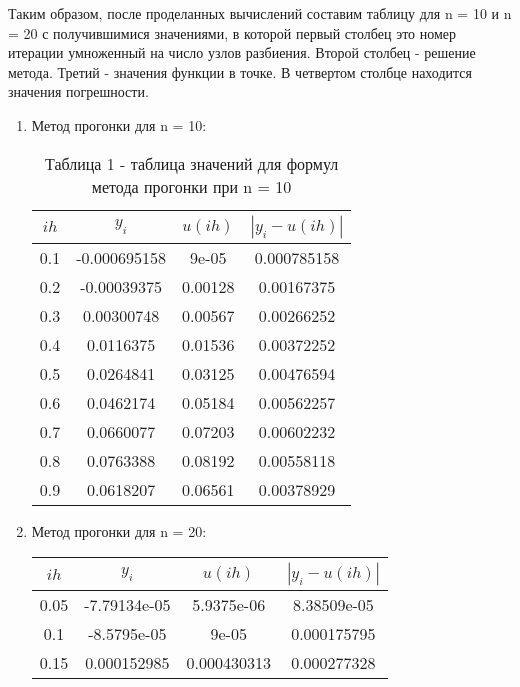\documentclass[a4paper,12pt]{article}
\begin{document}
Таким образом, после проделанных вычислений составим таблицу для n = 10 и n = 20 
с получившимися значениями, в которой первый столбец это номер итерации умноженный на число узлов разбиения.
Второй столбец - решение метода. Третий - значения функции в точке. В четвертом столбце находится значения погрешности.
\begin{enumerate}[label = \arabic*.]
    \item {Метод прогонки для n = 10:
        \begin{table}[h]
        \centering
        \begin{tabular}{|c|c|c|c|}
            \hline
            $ih$ & $y_i$ & $u(ih)$ & $\left|y_i-u(ih)\right|$\\ \hline
            0.1 & -0.000695158 &        9e-05 &  0.000785158\\ \hline
            0.2 &  -0.00039375 &      0.00128 &   0.00167375\\ \hline
            0.3 &   0.00300748 &      0.00567 &   0.00266252\\ \hline
            0.4 &    0.0116375 &      0.01536 &   0.00372252\\ \hline
            0.5 &    0.0264841 &      0.03125 &   0.00476594\\ \hline
            0.6 &    0.0462174 &      0.05184 &   0.00562257\\ \hline
            0.7 &    0.0660077 &      0.07203 &   0.00602232\\ \hline
            0.8 &    0.0763388 &      0.08192 &   0.00558118\\ \hline
            0.9 &    0.0618207 &      0.06561 &   0.00378929\\ \hline
        \end{tabular}
        \caption*{\small{Таблица 1 - таблица значений для формул метода прогонки при n = 10}}
        \end{table}
    }
    \item {Метод прогонки для n = 20:
      \begin{table}[h]
      \centering
      \begin{tabular}{|c|c|c|c|}
          \hline
          $ih$ & $y_i$ & $u(ih)$ & $\left|y_i-u(ih)\right|$\\ \hline
          0.05 & -7.79134e-05 &   5.9375e-06 &  8.38509e-05\\ \hline
          0.1 &  -8.5795e-05 &        9e-05 &  0.000175795\\ \hline
          0.15 &  0.000152985 &  0.000430313 &  0.000277328\\ \hline

\end{tabular}
\end{table}}
\end{enumerate}
\end{document}
